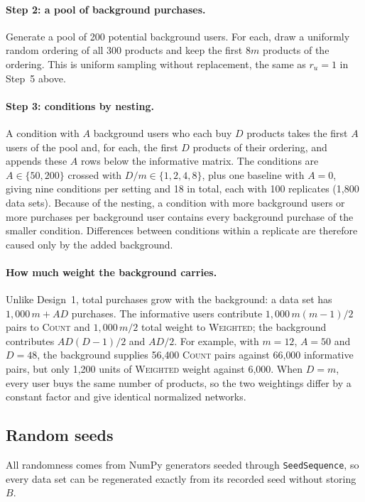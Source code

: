 \documentclass[12pt]{article}
\newcommand{\Count}{\textsc{Count}}
\newcommand{\Wtd}{\textsc{Weighted}}
\begin{document}
\paragraph{Step 2: a pool of background purchases.} Generate a pool of 200 potential background users. For each, draw a uniformly random ordering of all 300 products and keep the first $8m$ products of the ordering. This is uniform sampling without replacement, the same as $r_u=1$ in Step~5 above.

\paragraph{Step 3: conditions by nesting.} A condition with $A$ background users who each buy $D$ products takes the first $A$ users of the pool and, for each, the first $D$ products of their ordering, and appends these $A$ rows below the informative matrix. The conditions are $A\in\{50,200\}$ crossed with $D/m\in\{1,2,4,8\}$, plus one baseline with $A=0$, giving nine conditions per setting and 18 in total, each with 100 replicates (1{,}800 data sets). Because of the nesting, a condition with more background users or more purchases per background user contains every background purchase of the smaller condition. Differences between conditions within a replicate are therefore caused only by the added background.

\paragraph{How much weight the background carries.} Unlike Design~1, total purchases grow with the background: a data set has $1{,}000\,m+AD$ purchases. The informative users contribute $1{,}000\,m(m-1)/2$ pairs to \Count{} and $1{,}000\,m/2$ total weight to \Wtd; the background contributes $AD(D-1)/2$ and $AD/2$. For example, with $m=12$, $A=50$ and $D=48$, the background supplies 56{,}400 \Count{} pairs against 66{,}000 informative pairs, but only 1{,}200 units of \Wtd{} weight against 6{,}000. When $D=m$, every user buys the same number of products, so the two weightings differ by a constant factor and give identical normalized networks.

\subsection{Random seeds}

All randomness comes from NumPy generators seeded through \texttt{SeedSequence}, so every data set can be regenerated exactly from its recorded seed without storing $B$.
\end{document}
